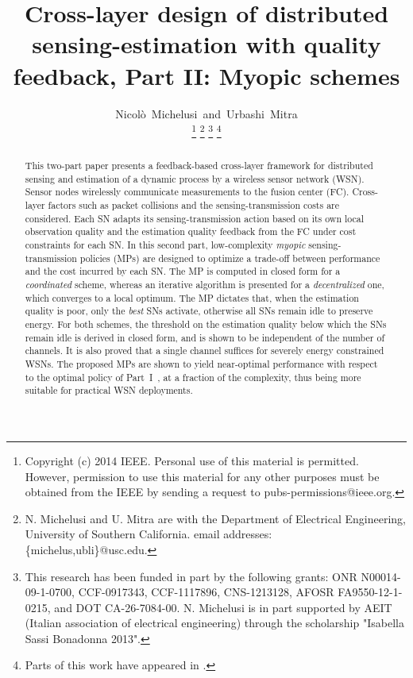 \documentclass[10pt,twocolumn,twoside]{IEEEtran}
\theoremstyle{plain}
\begin{document}
\title{
Cross-layer design of distributed sensing-estimation with quality feedback, Part II: Myopic schemes
}

\author{Nicol\`{o}~Michelusi~and~Urbashi~Mitra


\thanks{Copyright (c) 2014 IEEE. Personal use of this material is permitted. However, permission to use this material for any other purposes must be obtained from the IEEE by sending a request to pubs-permissions@ieee.org.}
\thanks{N. Michelusi and U. Mitra are with the Department of Electrical Engineering, University of Southern California. email addresses: \{michelus,ubli\}@usc.edu.}
\thanks{This research has been funded in part by the following grants:
ONR N00014-09-1-0700, CCF-0917343, CCF-1117896, CNS-1213128, AFOSR FA9550-12-1-0215, and DOT CA-26-7084-00.
N. Michelusi is in part supported by AEIT (Italian association of electrical engineering) through the scholarship "Isabella Sassi Bonadonna 2013".
}
\thanks{Parts of this work have appeared in \cite{MicheAllerton,MicheGlobalsip}.}
}

\maketitle
\noindent\begin{abstract}
 This two-part paper presents a feedback-based cross-layer framework for distributed sensing and estimation of a dynamic process by a wireless sensor network (WSN).  Sensor nodes wirelessly communicate measurements to the fusion center (FC). Cross-layer factors such as packet collisions and the sensing-transmission costs are considered. Each SN adapts its sensing-transmission action based on its own local observation quality and the estimation quality feedback from the FC under cost constraints for each SN. In this second part, low-complexity \emph{myopic} sensing-transmission policies (MPs) are designed to optimize a trade-off between performance and the cost incurred by each SN. The MP is computed in closed form for a \emph{coordinated} scheme, whereas an iterative algorithm is presented for a \emph{decentralized} one, which converges to a local optimum. The MP dictates that, when the estimation quality is poor, only the \emph{best} SNs activate, otherwise all SNs remain idle to preserve energy. For both schemes, the threshold on the estimation quality below which the SNs remain idle is derived in closed form, and is shown to be independent of the number of channels. It is also proved that a single channel suffices for severely energy constrained WSNs. The proposed MPs are shown to yield near-optimal performance with respect to the optimal policy of Part~I~\cite{MichelusiP1}, at a fraction of the complexity, thus being more suitable for practical WSN deployments.
\end{abstract}
\vspace{-3mm}
\end{document}
